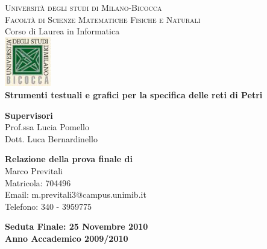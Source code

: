 
\begin{titlepage}
\begin{center}

\textsc{\Large  Università degli studi di Milano-Bicocca}\\[0.7cm]
\textsc{\normalsize Facoltà di Scienze Matematiche Fisiche e Naturali}\\[0.7cm]
{ \normalsize Corso di Laurea in Informatica}\\[1.5cm]

\includegraphics[width=0.15\textwidth]{img/bicocca.jpg}\\[1.5cm]

{\Large \bfseries Strumenti testuali e grafici per la specifica delle reti di Petri}\\[1cm]



\begin{flushleft} \large
{\bf Supervisori}\\
Prof.ssa Lucia Pomello\\
Dott. Luca Bernardinello
\end{flushleft}



\begin{flushright} \large
{\bf Relazione della prova finale di} \\
Marco Previtali\\
Matricola: 704496\\
Email: m.previtali3@campus.unimib.it\\
Telefono: 340 - 3959775\\
\end{flushright}


\vfill

{\bf 
Seduta Finale: 25 Novembre 2010\\
{\large Anno Accademico 2009/2010}
}

\end{center}
\end{titlepage}
